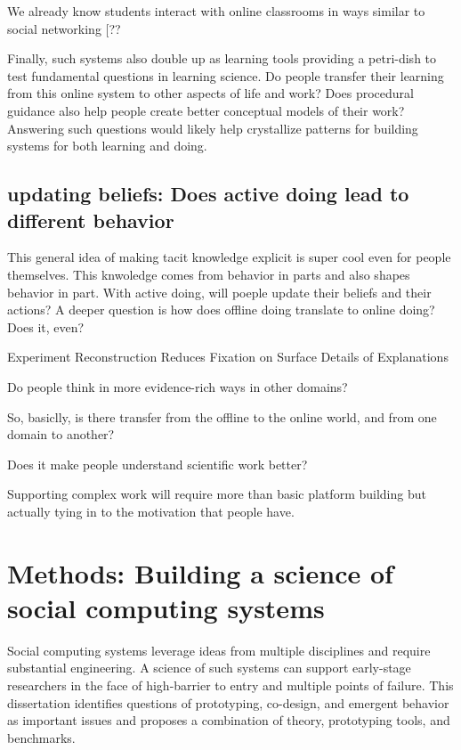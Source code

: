 We already know students interact with online classrooms in ways similar to social networking [??

Finally, such systems also double up as learning tools providing a petri-dish to test fundamental questions in learning science. Do people transfer their learning from this online system to other aspects of life and work? Does procedural guidance also help people create better conceptual models of their work? Answering such questions would likely help crystallize patterns for building systems for both learning and doing.


\subsection{updating beliefs: Does active doing lead to different behavior}
This general idea of making tacit knowledge explicit is super cool even for people themselves. This knwoledge comes from behavior in parts and also shapes behavior in part. With active doing, will poeple update their beliefs and their actions? A deeper question is how does offline doing translate to online doing? Does it, even?

Experiment Reconstruction Reduces Fixation on Surface Details of Explanations

Do people think in more evidence-rich ways in other domains?

So, basiclly, is there transfer from the offline to the online world, and from one domain to another?

Does it make people understand scientific work better?

Supporting complex work will require more than basic platform building but actually tying in to the motivation that people have.


\section{Methods: Building a science of social computing systems}

Social computing systems leverage ideas from multiple disciplines and require substantial engineering. A science of such systems can support early-stage researchers in the face of high-barrier to entry and multiple points of failure. This dissertation identifies questions of prototyping, co-design, and emergent behavior as important issues and proposes a combination of theory, prototyping tools, and benchmarks. 

